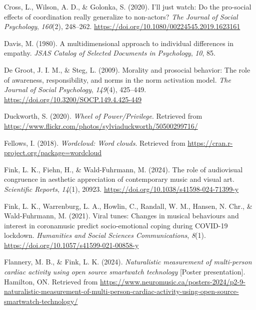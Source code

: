 \documentclass[
  man,floatsintext]{apa6}
\newlength{\cslhangindent}
\newenvironment{CSLReferences}[2] %
 {\begin{list}{}{%
  \setlength{\itemindent}{0pt}
  \setlength{\leftmargin}{0pt}
  \setlength{\parsep}{0pt}
  \ifodd #1
   \setlength{\leftmargin}{\cslhangindent}
   \setlength{\itemindent}{-1\cslhangindent}
  \fi
  \setlength{\itemsep}{#2\baselineskip}}}
 {\end{list}}
\begin{document}
\begin{CSLReferences}{1}{0}
Cross, L., Wilson, A. D., \& Golonka, S. (2020). I'll just watch: {Do} the pro-social effects of coordination really generalize to non-actors? \emph{The Journal of Social Psychology}, \emph{160}(2), 248--262. \url{https://doi.org/10.1080/00224545.2019.1623161}

Davis, M. (1980). A multidimensional approach to individual differences in empathy. \emph{JSAS Catalog of Selected Documents in Psychology}, \emph{10}, 85.

De Groot, J. I. M., \& Steg, L. (2009). Morality and prosocial behavior: {The} role of awareness, responsibility, and norms in the norm activation model. \emph{The Journal of Social Psychology}, \emph{149}(4), 425--449. \url{https://doi.org/10.3200/SOCP.149.4.425-449}

Duckworth, S. (2020). \emph{Wheel of {Power}/{Privilege}}. Retrieved from \url{https://www.flickr.com/photos/sylviaduckworth/50500299716/}

Fellows, I. (2018). \emph{Wordcloud: Word clouds}. Retrieved from \url{https://cran.r-project.org/package=wordcloud}

Fink, L. K., Fiehn, H., \& Wald-Fuhrmann, M. (2024). The role of audiovisual congruence in aesthetic appreciation of contemporary music and visual art. \emph{Scientific Reports}, \emph{14}(1), 20923. \url{https://doi.org/10.1038/s41598-024-71399-y}

Fink, L. K., Warrenburg, L. A., Howlin, C., Randall, W. M., Hansen, N. Chr., \& Wald-Fuhrmann, M. (2021). Viral tunes: Changes in musical behaviours and interest in coronamusic predict socio-emotional coping during {COVID}-19 lockdown. \emph{Humanities and Social Sciences Communications}, \emph{8}(1). \url{https://doi.org/10.1057/s41599-021-00858-y}

Flannery, M. B., \& Fink, L. K. (2024). \emph{Naturalistic measurement of multi-person cardiac activity using open source smartwatch technology} {[}Poster presentation{]}. Hamilton, ON. Retrieved from \url{https://www.neuromusic.ca/posters-2024/p2-9-naturalistic-measurement-of-multi-person-cardiac-activity-using-open-source-smartwatch-technology/}


\end{CSLReferences}
\end{document}
